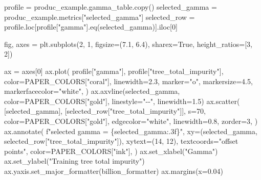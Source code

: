 \documentclass[
  letterpaper,
  DIV=11,
  numbers=noendperiod]{scrartcl}
\newenvironment{Shaded}{\begin{snugshade}}{\end{snugshade}}
\newcommand{\DecValTok}[1]{\textcolor[rgb]{0.68,0.00,0.00}{#1}}
\newcommand{\FloatTok}[1]{\textcolor[rgb]{0.68,0.00,0.00}{#1}}
\newcommand{\NormalTok}[1]{\textcolor[rgb]{0.00,0.23,0.31}{#1}}
\newcommand{\OperatorTok}[1]{\textcolor[rgb]{0.37,0.37,0.37}{#1}}
\newcommand{\SpecialCharTok}[1]{\textcolor[rgb]{0.37,0.37,0.37}{#1}}
\newcommand{\SpecialStringTok}[1]{\textcolor[rgb]{0.13,0.47,0.30}{#1}}
\newcommand{\StringTok}[1]{\textcolor[rgb]{0.13,0.47,0.30}{#1}}
\newcommand{\VariableTok}[1]{\textcolor[rgb]{0.07,0.07,0.07}{#1}}
\begin{document}
\begin{Shaded}
\begin{Highlighting}[]
\NormalTok{profile }\OperatorTok{=}\NormalTok{ produc\_example.gamma\_table.copy()}
\NormalTok{selected\_gamma }\OperatorTok{=}\NormalTok{ produc\_example.metrics[}\StringTok{"selected\_gamma"}\NormalTok{]}
\NormalTok{selected\_row }\OperatorTok{=}\NormalTok{ profile.loc[profile[}\StringTok{"gamma"}\NormalTok{].eq(selected\_gamma)].iloc[}\DecValTok{0}\NormalTok{]}

\NormalTok{fig, axes }\OperatorTok{=}\NormalTok{ plt.subplots(}\DecValTok{2}\NormalTok{, }\DecValTok{1}\NormalTok{, figsize}\OperatorTok{=}\NormalTok{(}\FloatTok{7.1}\NormalTok{, }\FloatTok{6.4}\NormalTok{), sharex}\OperatorTok{=}\VariableTok{True}\NormalTok{, height\_ratios}\OperatorTok{=}\NormalTok{[}\DecValTok{3}\NormalTok{, }\DecValTok{2}\NormalTok{])}

\NormalTok{ax }\OperatorTok{=}\NormalTok{ axes[}\DecValTok{0}\NormalTok{]}
\NormalTok{ax.plot(}
\NormalTok{    profile[}\StringTok{"gamma"}\NormalTok{],}
\NormalTok{    profile[}\StringTok{"tree\_total\_impurity"}\NormalTok{],}
\NormalTok{    color}\OperatorTok{=}\NormalTok{PAPER\_COLORS[}\StringTok{"coral"}\NormalTok{],}
\NormalTok{    linewidth}\OperatorTok{=}\FloatTok{2.3}\NormalTok{,}
\NormalTok{    marker}\OperatorTok{=}\StringTok{"o"}\NormalTok{,}
\NormalTok{    markersize}\OperatorTok{=}\FloatTok{4.5}\NormalTok{,}
\NormalTok{    markerfacecolor}\OperatorTok{=}\StringTok{"white"}\NormalTok{,}
\NormalTok{)}
\NormalTok{ax.axvline(selected\_gamma, color}\OperatorTok{=}\NormalTok{PAPER\_COLORS[}\StringTok{"gold"}\NormalTok{], linestyle}\OperatorTok{=}\StringTok{"{-}{-}"}\NormalTok{, linewidth}\OperatorTok{=}\FloatTok{1.5}\NormalTok{)}
\NormalTok{ax.scatter(}
\NormalTok{    [selected\_gamma],}
\NormalTok{    [selected\_row[}\StringTok{"tree\_total\_impurity"}\NormalTok{]],}
\NormalTok{    s}\OperatorTok{=}\DecValTok{70}\NormalTok{,}
\NormalTok{    color}\OperatorTok{=}\NormalTok{PAPER\_COLORS[}\StringTok{"gold"}\NormalTok{],}
\NormalTok{    edgecolor}\OperatorTok{=}\StringTok{"white"}\NormalTok{,}
\NormalTok{    linewidth}\OperatorTok{=}\FloatTok{0.8}\NormalTok{,}
\NormalTok{    zorder}\OperatorTok{=}\DecValTok{3}\NormalTok{,}
\NormalTok{)}
\NormalTok{ax.annotate(}
    \SpecialStringTok{f"selected gamma = }\SpecialCharTok{\{}\NormalTok{selected\_gamma}\SpecialCharTok{:.3f\}}\SpecialStringTok{"}\NormalTok{,}
\NormalTok{    xy}\OperatorTok{=}\NormalTok{(selected\_gamma, selected\_row[}\StringTok{"tree\_total\_impurity"}\NormalTok{]),}
\NormalTok{    xytext}\OperatorTok{=}\NormalTok{(}\DecValTok{14}\NormalTok{, }\DecValTok{12}\NormalTok{),}
\NormalTok{    textcoords}\OperatorTok{=}\StringTok{"offset points"}\NormalTok{,}
\NormalTok{    color}\OperatorTok{=}\NormalTok{PAPER\_COLORS[}\StringTok{"ink"}\NormalTok{],}
\NormalTok{)}
\NormalTok{ax.set\_xlabel(}\StringTok{"Gamma"}\NormalTok{)}
\NormalTok{ax.set\_ylabel(}\StringTok{"Training tree total impurity"}\NormalTok{)}
\NormalTok{ax.yaxis.set\_major\_formatter(billion\_formatter)}
\NormalTok{ax.margins(x}\OperatorTok{=}\FloatTok{0.04}\NormalTok{)}


\end{Highlighting}
\end{Shaded}
\end{document}
